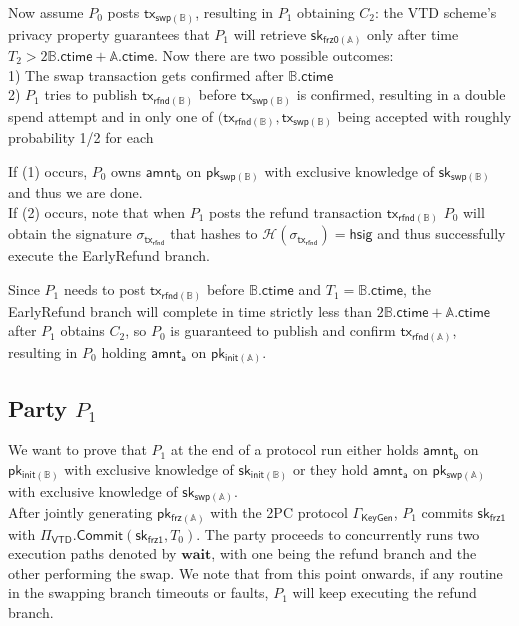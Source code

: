 \documentclass{article}      	%
\begin{document}
Now assume $P_0$ posts $\mathsf{tx_{swp(\mathbb{B})}}$, resulting in $P_1$ obtaining $C_2$: the VTD scheme's privacy property guarantees that $P_1$ will retrieve $\mathsf{sk_{frz0(\mathbb{A})}}$ only after time $T_2 > 2\mathbb{B}.\mathsf{ctime}  + \mathbb{A}.\mathsf{ctime}$. Now there are two possible outcomes: \\
1) The swap transaction gets confirmed after $\mathbb{B}.\mathsf{ctime}$  \\
2) $P_1$ tries to publish $\mathsf{tx_{rfnd(\mathbb{B})}}$ before $\mathsf{tx_{swp(\mathbb{B})}}$ is confirmed, resulting in a double spend attempt and in only one of $(\mathsf{tx_{rfnd(\mathbb{B})}}, \mathsf{tx_{swp(\mathbb{B})}}$ being accepted with roughly probability 1/2 for each

If (1) occurs, $P_0$ owns $\mathsf{amnt_b}$ on $\mathsf{pk_{swp(\mathbb{B})}}$ with exclusive knowledge of $\mathsf{sk_{swp(\mathbb{B})}}$ and thus we are done. \\
If (2) occurs, note that when $P_1$ posts the refund transaction $\mathsf{tx_{rfnd(\mathbb{B})}}$ $P_0$ will obtain the signature $\sigma_{\mathsf{tx_{rfnd}}}$ that hashes to $\mathcal{H}(\sigma_{\mathsf{tx_{rfnd}}}) = \mathsf{hsig}$  and thus successfully execute the EarlyRefund branch.

Since $P_1$ needs to post $\mathsf{tx_{rfnd(\mathbb{B})}}$ before $\mathbb{B}.\mathsf{ctime}$ and $T_1 = \mathbb{B}.\mathsf{ctime}$, the EarlyRefund branch will complete in time strictly less than $2\mathbb{B}.\mathsf{ctime} + \mathbb{A}.\mathsf{ctime}$ after $P_1$ obtains $C_2$, so $P_0$ is guaranteed to publish and confirm $\mathsf{tx_{rfnd(\mathbb{A})}}$, resulting in $P_0$ holding $\mathsf{amnt_a}$ on $\mathsf{pk_{init(\mathbb{A})}}$.


\subsection{Party $P_1$}
We want to prove that $P_1$ at the end of a protocol run either holds $\mathsf{amnt_b}$ on $\mathsf{pk_{init(\mathbb{B})}}$ with exclusive knowledge of $\mathsf{sk_{init(\mathbb{B})}}$ or they hold $\mathsf{amnt_a}$ on $\mathsf{pk_{swp(\mathbb{A})}}$ with exclusive knowledge of $\mathsf{sk_{swp(\mathbb{A})}}$. \\

After jointly generating $\mathsf{pk_{frz(\mathbb{A})}}$ with the 2PC protocol $\Gamma_{\mathsf{KeyGen}}$, $P_1$ commits $\mathsf{sk_{frz1}}$ with $\Pi_{\mathsf{VTD}}.\mathsf{Commit}(\mathsf{sk_{frz1}}, T_0)$. 
The party proceeds to concurrently runs two execution paths denoted by $\textbf{wait}$, with one being the refund branch and the other performing the swap. We note that from this point onwards, if any routine in the swapping branch timeouts or faults, $P_1$ will keep executing the refund branch. \\
\end{document}
